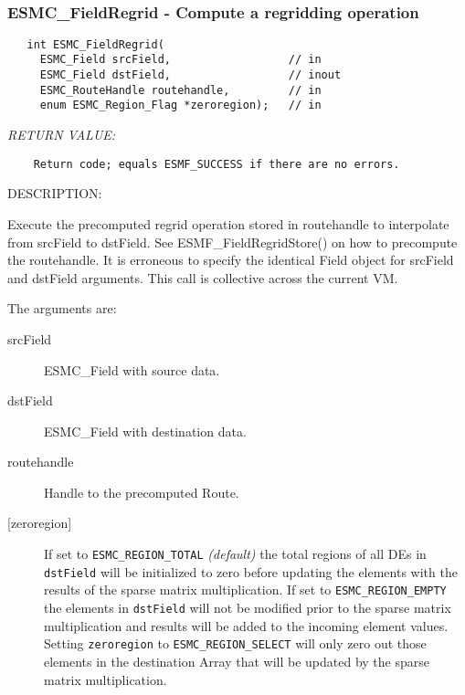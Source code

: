  
\mbox{}\hrulefill\ 
 
\subsubsection [ESMC\_FieldRegrid] {ESMC\_FieldRegrid - Compute a regridding operation}


  
\begin{verbatim}   int ESMC_FieldRegrid( 
     ESMC_Field srcField,                  // in
     ESMC_Field dstField,                  // inout
     ESMC_RouteHandle routehandle,         // in
     enum ESMC_Region_Flag *zeroregion);   // in
 \end{verbatim}{\em RETURN VALUE:}
\begin{verbatim}    Return code; equals ESMF_SUCCESS if there are no errors.\end{verbatim}
{\sf DESCRIPTION:\\ }


  
    Execute the precomputed regrid operation stored in routehandle to interpolate 
    from srcField to dstField. See ESMF\_FieldRegridStore() on how to precompute
    the routehandle.  It is erroneous to specify the identical Field object for
    srcField and dstField arguments.  This call is collective across the 
    current VM.
  
    The arguments are:
    \begin{description}
    \item[srcField]
      ESMC\_Field with source data.
    \item[dstField]
      ESMC\_Field with destination data.
    \item[routehandle]
      Handle to the precomputed Route.
    \item [{[zeroregion]}]
      \begin{sloppypar}
      If set to {\tt ESMC\_REGION\_TOTAL} {\em (default)} the total regions of
      all DEs in {\tt dstField} will be initialized to zero before updating the 
      elements with the results of the sparse matrix multiplication. If set to
      {\tt ESMC\_REGION\_EMPTY} the elements in {\tt dstField} will not be
      modified prior to the sparse matrix multiplication and results will be
      added to the incoming element values. Setting {\tt zeroregion} to 
      {\tt ESMC\_REGION\_SELECT} will only zero out those elements in the 
      destination Array that will be updated by the sparse matrix
      multiplication.
      \end{sloppypar}
    \end{description}
   
